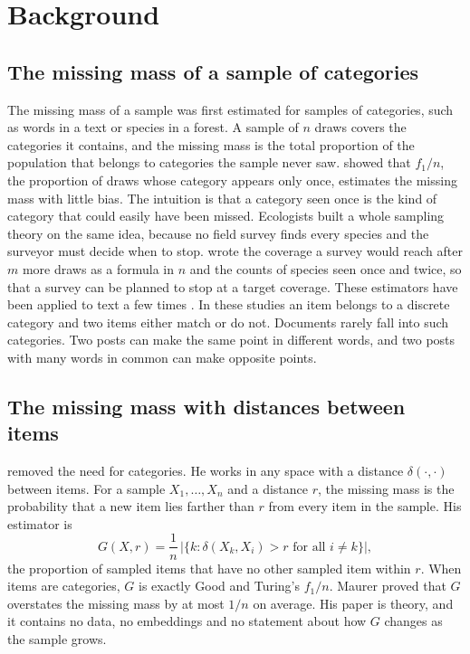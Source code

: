 \section{Background}

\subsection{The missing mass of a sample of categories}

The missing mass of a sample was first estimated for samples of categories, such as words in a text or species in a forest. A sample of $n$ draws covers the categories it contains, and the missing mass is the total proportion of the population that belongs to categories the sample never saw. \citet{good1953} showed that $f_1/n$, the proportion of draws whose category appears only once, estimates the missing mass with little bias. The intuition is that a category seen once is the kind of category that could easily have been missed. Ecologists built a whole sampling theory on the same idea, because no field survey finds every species and the surveyor must decide when to stop. \citet{chao2012coverage} wrote the coverage a survey would reach after $m$ more draws as a formula in $n$ and the counts of species seen once and twice, so that a survey can be planned to stop at a target coverage. These estimators have been applied to text a few times \citep{tran2017,hajic2025}. In these studies an item belongs to a discrete category and two items either match or do not. Documents rarely fall into such categories. Two posts can make the same point in different words, and two posts with many words in common can make opposite points.

\subsection{The missing mass with distances between items}

\citet{maurer2022missing} removed the need for categories. He works in any space with a distance $\delta(\cdot, \cdot)$ between items. For a sample $X_1, \dots, X_n$ and a distance $r$, the missing mass is the probability that a new item lies farther than $r$ from every item in the sample. His estimator is
\begin{equation}
G(X, r) = \frac{1}{n}\,\big|\{k : \delta(X_k, X_i) > r \text{ for all } i \neq k\}\big| ,
\label{eq:G}
\end{equation}
the proportion of sampled items that have no other sampled item within $r$. When items are categories, $G$ is exactly Good and Turing's $f_1/n$. Maurer proved that $G$ overstates the missing mass by at most $1/n$ on average. His paper is theory, and it contains no data, no embeddings and no statement about how $G$ changes as the sample grows.

